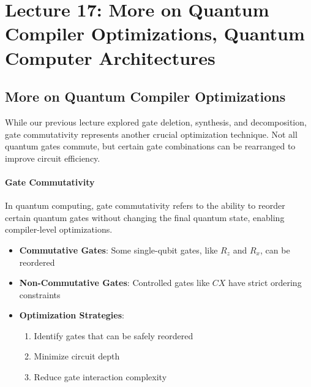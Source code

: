 \section{Lecture 17: More on Quantum Compiler Optimizations, Quantum Computer
Architectures}\label{sec:lecture17}

\subsection*{More on Quantum Compiler Optimizations}

While our previous lecture explored gate deletion, synthesis, and
decomposition, gate commutativity represents another crucial optimization
technique. Not all quantum gates commute, but certain gate combinations can
be rearranged to improve circuit efficiency.

\paragraph{Gate Commutativity}
In quantum computing, gate commutativity refers to the ability to reorder
certain quantum gates without changing the final quantum state, enabling
compiler-level optimizations.

\begin{itemize}
  \item \textbf{Commutative Gates}: Some single-qubit gates, like $R_z$ and
    $R_x$, can be reordered

  \item \textbf{Non-Commutative Gates}: Controlled gates like $CX$ have
    strict ordering constraints

  \item \textbf{Optimization Strategies}:
    \begin{enumerate}
      \item Identify gates that can be safely reordered
      \item Minimize circuit depth
      \item Reduce gate interaction complexity
    \end{enumerate}
\end{itemize}



